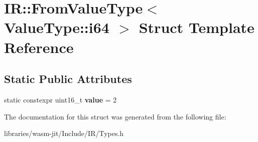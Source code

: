 \hypertarget{struct_i_r_1_1_from_value_type_3_01_value_type_1_1i64_01_4}{}\section{IR\+:\+:From\+Value\+Type$<$ Value\+Type\+:\+:i64 $>$ Struct Template Reference}
\label{struct_i_r_1_1_from_value_type_3_01_value_type_1_1i64_01_4}
\subsection*{Static Public Attributes}
\begin{DoxyCompactItemize}
\item 
\mbox{\label{struct_i_r_1_1_from_value_type_3_01_value_type_1_1i64_01_4_a507a6f14c5c7858b9ed8be73a6b94370}} 
static constexpr uint16\+\_\+t {\bfseries value} = 2
\end{DoxyCompactItemize}


The documentation for this struct was generated from the following file\+:\begin{DoxyCompactItemize}
\item 
libraries/wasm-\/jit/\+Include/\+I\+R/Types.\+h\end{DoxyCompactItemize}
